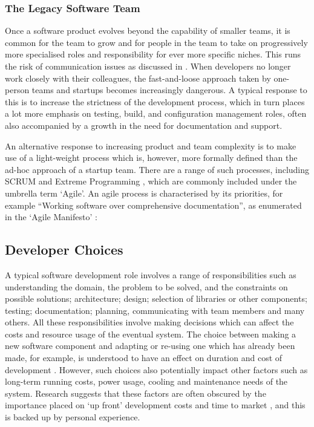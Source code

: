 \subsubsection{The Legacy Software Team}
Once a software product evolves beyond the capability of smaller teams, it is common for the team to grow and for people in the team to take on progressively more specialised roles and responsibility for ever more specific niches. This runs the risk of communication issues as discussed in \citet{Brooks1995}. When developers no longer work closely with their colleagues, the fast-and-loose approach taken by one-person teams and startups becomes increasingly dangerous. A typical response to this is to increase the strictness of the development process, which in turn places a lot more emphasis on testing, build, and configuration management roles, often also accompanied by a growth in the need for documentation and support.

An alternative response to increasing product and team complexity is to make use of a light-weight process which is, however, more formally defined than the ad-hoc approach of a startup team. There are a range of such processes, including SCRUM \citep{Schwaber1997} and Extreme Programming \citep{Beck2000}, which are commonly included under the umbrella term `Agile'. An agile process is characterised by its priorities, for example \enquote{Working software over comprehensive documentation}, as enumerated in the `Agile Manifesto' \citep{Beck2001}:

\subsection{Developer Choices}
\label{subsection:developer choices}

A typical software development role involves a range of responsibilities such as understanding the domain, the problem to be solved, and the constraints on possible solutions; architecture; design; selection of libraries or other components; testing; documentation; planning, communicating with team members and many others. All these responsibilities involve making decisions which can affect the costs and resource usage of the eventual system. The choice between making a new software component and adapting or re-using one which has already been made, for example, is understood to have an effect on duration and cost of development \citep{Gacek2002}. However, such choices also potentially impact other factors such as long-term running costs, power usage, cooling and maintenance needs of the system. Research suggests that these factors are often obscured by the importance placed on `up front' development costs and time to market \citep{Petro2017}, and this is backed up by personal experience.

